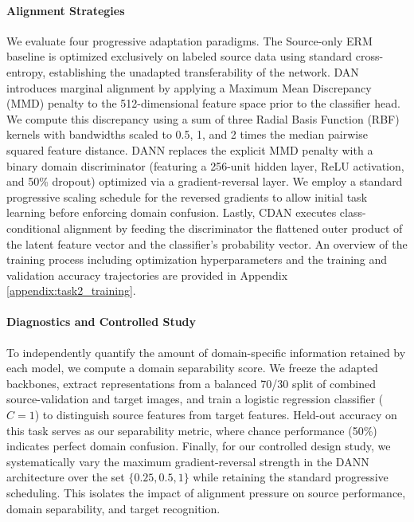\documentclass{article}
\begin{document}
\paragraph{Alignment Strategies}
We evaluate four progressive adaptation paradigms. The Source-only ERM baseline is optimized exclusively on labeled source data using standard cross-entropy, establishing the unadapted transferability of the network. DAN \citep{pmlr-v37-long15} introduces marginal alignment by applying a Maximum Mean Discrepancy (MMD) penalty to the 512-dimensional feature space prior to the classifier head. We compute this discrepancy using a sum of three Radial Basis Function (RBF) kernels with bandwidths scaled to 0.5, 1, and 2 times the median pairwise squared feature distance. DANN \citep{JMLR:v17:15-239} replaces the explicit MMD penalty with a binary domain discriminator (featuring a 256-unit hidden layer, ReLU activation, and 50\% dropout) optimized via a gradient-reversal layer. We employ a standard progressive scaling schedule for the reversed gradients to allow initial task learning before enforcing domain confusion. Lastly, CDAN \citep{NEURIPS2018_ab88b157} executes class-conditional alignment by feeding the discriminator the flattened outer product of the latent feature vector and the classifier's probability vector. An overview of the training process including optimization hyperparameters and the training and validation accuracy trajectories are provided in Appendix \ref{appendix:task2_training}.


\paragraph{Diagnostics and Controlled Study}
To independently quantify the amount of domain-specific information retained by each model, we compute a domain separability score. We freeze the adapted backbones, extract representations from a balanced 70/30 split of combined source-validation and target images, and train a logistic regression classifier ($C=1$) to distinguish source features from target features. Held-out accuracy on this task serves as our separability metric, where chance performance (50\%) indicates perfect domain confusion. Finally, for our controlled design study, we systematically vary the maximum gradient-reversal strength in the DANN architecture over the set $\{0.25, 0.5, 1\}$ while retaining the standard progressive scheduling. This isolates the impact of alignment pressure on source performance, domain separability, and target recognition.
\end{document}
